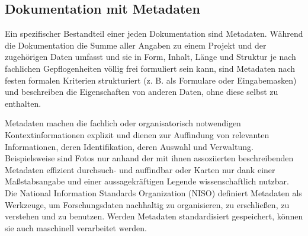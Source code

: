 
\subsection{Dokumentation mit Metadaten}
Ein spezifischer Bestandteil einer jeden Dokumentation sind Metadaten. Während die Dokumentation die Summe aller Angaben zu einem Projekt und der zugehörigen Daten umfasst und sie in Form, Inhalt, Länge und Struktur je nach fachlichen Gepflogenheiten völlig frei formuliert sein kann, sind Metadaten nach festen formalen Kriterien strukturiert (z. B. als Formulare oder Eingabemasken) und beschreiben die Eigenschaften von anderen Daten, ohne diese selbst zu enthalten.

Metadaten machen die fachlich oder organisatorisch notwendigen Kontextinformationen explizit und dienen zur Auffindung von relevanten Informationen, deren Identifikation, deren Auswahl und Verwaltung. Beispielsweise sind Fotos nur anhand der mit ihnen assoziierten beschreibenden Metadaten effizient durchsuch- und auffindbar oder Karten nur dank einer Maßstabsangabe und einer aussagekräftigen Legende wissenschaftlich nutzbar. Die National Information Standards Organization (NISO) definiert Metadaten als Werkzeuge, um Forschungsdaten nachhaltig zu organisieren, zu erschließen, zu verstehen und zu benutzen. Werden Metadaten standardisiert gespeichert, können sie auch maschinell verarbeitet werden.

